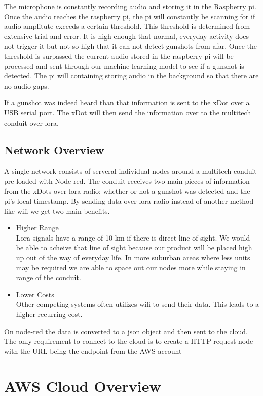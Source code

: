 \documentclass[conference]{IEEEtran}
\begin{document}
The microphone is constantly recording audio and storing it in the Raspberry pi. Once the audio reaches the raspberry pi, the pi will constantly be scanning for if audio amplitute exceeds a certain threshold. This threshold is determined from extensive trial and error. It is high enough that normal, everyday activity does not trigger it but not so high that it can not detect gunshots from afar. 
Once the threshold is surpassed the current audio stored in the raspberry pi will be processed and sent through our machine learning model to see if a gunshot is detected. The pi will containing storing audio in the background so that there are no audio gaps.

If a gunshot was indeed heard than that information is sent to the xDot over a USB serial port. The xDot will then send the information over to the multitech conduit over lora.

\subsection{Network Overview}
A single network consists of serveral individual nodes around a multitech conduit pre-loaded with Node-red. The conduit receives two main pieces of information from the xDots over lora radio: whether or not a gunshot was detected and the pi's local timestamp. By sending data over lora radio instead of another method like wifi we get two main benefits.
 
\begin{itemize}
\item Higher Range\\  Lora signals have a range of 10 km if there is direct line of sight. 
We would be able to acheive that line of sight because our product will be placed high up out of the way of everyday life. In more suburban areas where less units may be required we are able to space out our nodes more while staying in range of the conduit.
\item Lower Costs \\ Other competing systems often utilizes wifi to send their data. This leads to a higher recurring cost.

\end{itemize}

On node-red the data is converted to a json object and then sent to the cloud. The only requirement to connect to the cloud is to create a HTTP request node with the URL being the endpoint from the AWS account
\section{AWS Cloud Overview}
\end{document}
